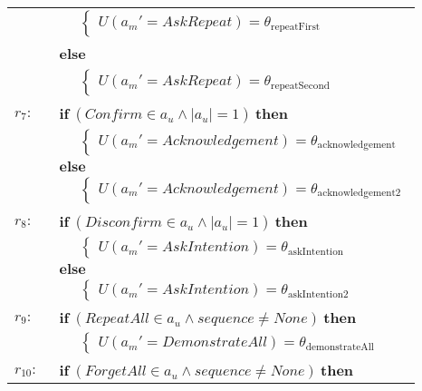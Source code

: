 \begin{footnotesize}
\begin{longtable}{p{1cm}l}
& $\;\;\;\;\; \begin{cases}U(\mathit{a_m}'\!=\!\mathit{AskRepeat})\!=\!\theta_{\mathrm{repeatFirst}}\end{cases}$ \\ & \textbf{else} \\
& $\;\;\;\;\; \begin{cases}U(\mathit{a_m}'\!=\!\mathit{AskRepeat})\!=\!\theta_{\mathrm{repeatSecond}}\end{cases}$ \\ \\[-1mm]
$r_{7}: \ \ $& $\textbf{if} \ (\mathit{Confirm}\!\in\!\mathit{a_u} \land \mathit{|a_u|}\!=\!\mathit{1}) \ \textbf{then}$ \\
& $\;\;\;\;\; \begin{cases}U(\mathit{a_m}'\!=\!\mathit{Acknowledgement})\!=\!\theta_{\mathrm{acknowledgement}}\end{cases}$ \\ 
& $\textbf{else}$ \\
& $\;\;\;\;\; \begin{cases}U(\mathit{a_m}'\!=\!\mathit{Acknowledgement})\!=\!\theta_{\mathrm{acknowledgement2}}\end{cases}$ \\ \\[-1mm]
$r_{8}: \ \ $& $\textbf{if} \ (\mathit{Disconfirm}\!\in\!\mathit{a_u} \land \mathit{|a_u|}\!=\!\mathit{1}) \ \textbf{then}$ \\
& $\;\;\;\;\; \begin{cases}U(\mathit{a_m}'\!=\!\mathit{AskIntention})\!=\!\theta_{\mathrm{askIntention}}\end{cases}$ \\ 
& $\textbf{else}$ \\
& $\;\;\;\;\; \begin{cases}U(\mathit{a_m}'\!=\!\mathit{AskIntention})\!=\!\theta_{\mathrm{askIntention2}}\end{cases}$\\ \\[-1mm]
$r_{9}: \ \ $& $\textbf{if} \ (\mathit{RepeatAll}\!\in\!\mathit{a_u} \land \mathit{sequence}\!\neq\!\mathit{None}) \ \textbf{then}$ \\
& $\;\;\;\;\; \begin{cases}U(\mathit{a_m}'\!=\!\mathit{DemonstrateAll})\!=\!\theta_{\mathrm{demonstrateAll}}\end{cases}$\\ \\[-1mm]
$r_{10}: \ \ $& $\textbf{if} \ (\mathit{ForgetAll}\!\in\!\mathit{a_u} \land \mathit{sequence}\!\neq\!\mathit{None}) \ \textbf{then}$ \\

\end{longtable}
\end{footnotesize}
